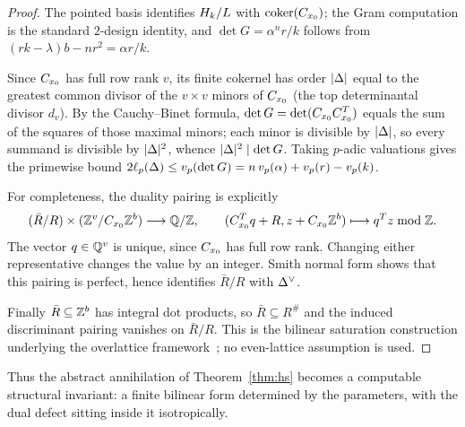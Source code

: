\begin{proof}
The pointed basis identifies $H_k/L$ with $\operatorname{coker}(C_{x_0})$; the Gram computation is
the standard $2$-design identity, and $\det G=\alpha^{n}r/k$ follows from
$(rk-\lambda)b-nr^{2}=\alpha r/k$.

Since $C_{x_0}$ has full row rank $v$, its finite cokernel has order $|\Delta|$ equal
to the greatest common divisor of the $v\times v$ minors of $C_{x_0}$ (the top
determinantal divisor $d_v$). By the Cauchy--Binet formula, $\det
G=\det(C_{x_0}C_{x_0}^{T})$ equals the sum of the squares of those maximal minors; each
minor is divisible by $|\Delta|$, so every summand is divisible by $|\Delta|^{2}$,
whence $|\Delta|^{2}\mid\det G$. Taking $p$-adic valuations gives the primewise
bound $2\ell_p(\Delta)\le v_p(\det G)=n\,v_p(\alpha)+v_p(r)-v_p(k)$.

For completeness, the duality pairing is explicitly
\[
(\bar R/R)\times(\mathbb{Z}^v/C_{x_0}\mathbb{Z}^b)\longrightarrow\mathbb{Q}/\mathbb{Z},
\qquad (C_{x_0}^Tq+R,z+C_{x_0}\mathbb{Z}^b)\longmapsto q^Tz\bmod\mathbb{Z}.
\]
The vector $q\in\mathbb{Q}^v$ is unique, since $C_{x_0}$ has full row rank.
Changing either representative changes the value by an integer. Smith normal
form shows that this pairing is perfect, hence identifies $\bar R/R$ with
$\Delta^\vee$.

Finally $\bar R\subseteq\mathbb{Z}^b$ has integral dot products,
so $\bar R\subseteq R^\#$ and the induced discriminant pairing vanishes on
$\bar R/R$. This is the bilinear saturation construction underlying the
overlattice framework~\cite{Nikulin}; no even-lattice assumption is used.
\end{proof}

Thus the abstract annihilation of Theorem~\ref{thm:hs} becomes a computable
structural invariant: a finite bilinear form determined by the parameters, with
the dual defect sitting inside it isotropically.

